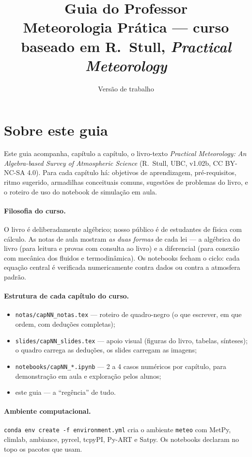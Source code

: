 \documentclass[11pt]{article}
\title{Guia do Professor\\ {\large Meteorologia Prática ---
curso baseado em R.~Stull, \emph{Practical Meteorology}}}
\author{}
\date{Versão de trabalho}
\begin{document}
\maketitle
\thispagestyle{fancy}

\section*{Sobre este guia}

Este guia acompanha, capítulo a capítulo, o livro-texto
\emph{Practical Meteorology: An Algebra-based Survey of Atmospheric Science}
(R.~Stull, UBC, v1.02b, CC BY-NC-SA 4.0). Para cada capítulo há:
objetivos de aprendizagem, pré-requisitos, ritmo sugerido, armadilhas
conceituais comuns, sugestões de problemas do livro, e o roteiro de uso do
notebook de simulação em aula.

\paragraph{Filosofia do curso.} O livro é deliberadamente algébrico; nosso
público é de estudantes de física com cálculo. As notas de aula mostram
\emph{as duas formas} de cada lei — a algébrica do livro (para leitura e
provas com consulta ao livro) e a diferencial (para conexão com mecânica dos
fluidos e termodinâmica). Os notebooks fecham o ciclo: cada equação central
é verificada numericamente contra dados ou contra a atmosfera padrão.

\paragraph{Estrutura de cada capítulo do curso.}
\begin{itemize}
  \item \texttt{notas/capNN\_notas.tex} — roteiro de quadro-negro (o que
        escrever, em que ordem, com deduções completas);
  \item \texttt{slides/capNN\_slides.tex} — apoio visual (figuras do livro,
        tabelas, sínteses); o quadro carrega as deduções, os slides carregam
        as imagens;
  \item \texttt{notebooks/capNN\_*.ipynb} — 2 a 4 casos numéricos por
        capítulo, para demonstração em aula e exploração pelos alunos;
  \item este guia — a ``regência'' de tudo.
\end{itemize}

\paragraph{Ambiente computacional.} \texttt{conda env create -f
environment.yml} cria o ambiente \texttt{meteo} com MetPy, climlab,
ambiance, pyrcel, tcpyPI, Py-ART e Satpy. Os notebooks declaram no topo os
pacotes que usam.
\end{document}

